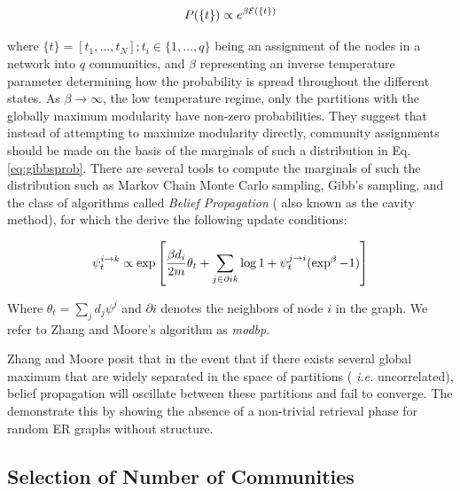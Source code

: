 \documentclass[11pt]{article}
\begin{document}
\begin{equation}
P(\{t\})  \propto e^{\-\beta {\mathcal{E}} (\{t\} )}
\label{eq:gibbsprob}
\end{equation}

where $\{t\} = [t_1,\hdots,t_N]; t_i \in \{1, ..., q\}$ being an assignment of the nodes in a network into $q$ communities, and $\beta$ representing an inverse temperature parameter determining how the probability is spread throughout the different states.  As $\beta \rightarrow \infty $, the low temperature regime, only the partitions with the globally maximum modularity have non-zero probabilities.  They suggest that instead of attempting to maximize modularity directly, community assignments should be made on the basis of the marginals of such a distribution in Eq.~ \ref{eq:gibbsprob}.  There are several tools to compute the marginals of such the distribution such as Markov Chain Monte Carlo sampling, Gibb's sampling, and the class of algorithms called \textit { Belief Propagation} ( also known as the cavity method), for which the derive the following update conditions: 

\begin{equation}
\psi^{i \to k }_t \propto \exp {\left [ \frac{\beta d_i }{2m}\theta_t  + \sum_{j\in \partial i \\ k} \log{1+\psi^{j \to i }_t(\exp^{\beta}-1)} \right ]}
\label{eq:modbp}
\end{equation}

Where $\theta_t=\sum_j{d_j\psi^{j}} $  and $\partial i$ denotes the neighbors of node $i$ in the graph.  We refer to Zhang and Moore's algorithm as \textit{modbp}. 

Zhang and Moore posit that in the event that if there exists several global maximum that are widely separated in the space of partitions ( \textit{i.e.} uncorrelated), belief propagation will oscillate between these partitions and fail to converge.  The demonstrate this by showing the absence of a non-trivial retrieval phase for random ER graphs without structure.  

\subsection{Selection of Number of Communities \label{numcom}}
\end{document}
